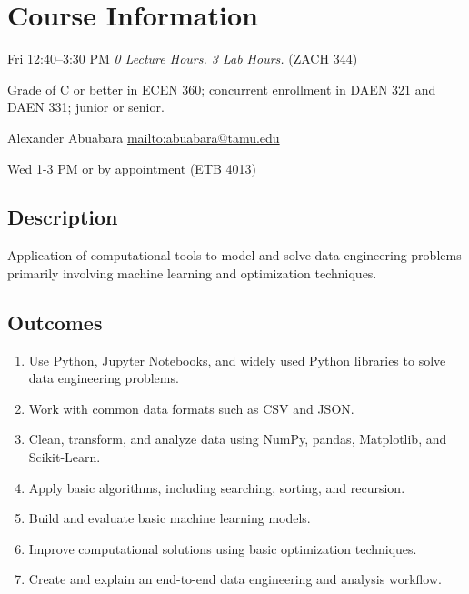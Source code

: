 \documentclass[10pt]{article}
\begin{document}
\title{}
\author{} %
\date{}
\maketitle
\vspace{-7.5em}

\section*{Course Information}
\begin{description}[nosep,leftmargin=0.5in]
\item[Time (Location)] Fri 12:40--3:30 PM \emph{0 Lecture Hours. 3 Lab Hours.} (ZACH 344)
\item[Prerequisites] Grade of C or better in ECEN 360; concurrent enrollment in DAEN 321 and DAEN 331; junior or senior.
\item[Instructor] Alexander Abuabara \url{mailto:abuabara@tamu.edu}
\item[Course office hours (location)] Wed 1-3 PM or by appointment (ETB 4013)
\end{description}

\subsection*{Description}
Application of computational tools to model and solve data engineering problems primarily involving machine learning and optimization techniques.

\subsection*{Outcomes}
\begin{enumerate}[leftmargin=*,nosep]
\item Use Python, Jupyter Notebooks, and widely used Python libraries to solve data engineering problems.
\item Work with common data formats such as CSV and JSON.
\item Clean, transform, and analyze data using NumPy, pandas, Matplotlib, and Scikit-Learn.
\item Apply basic algorithms, including searching, sorting, and recursion.
\item Build and evaluate basic machine learning models.
\item Improve computational solutions using basic optimization techniques.
\item Create and explain an end-to-end data engineering and analysis workflow.
\end{enumerate}
\end{document}
